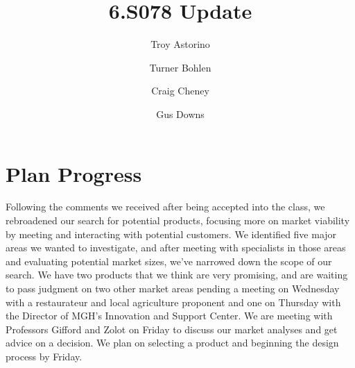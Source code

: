 \documentclass[10pt]{article}
\title{\vspace{-4em}6.S078 Update}
\author{Troy Astorino \and Turner Bohlen \and Craig Cheney \and Gus Downs}
\begin{document}
\maketitle

\section{Plan Progress}
Following the comments we received after being accepted into the class, we
rebroadened our search for potential products, focusing more on market viability
by meeting and interacting with potential customers. We identified five major
areas we wanted to investigate, and after meeting with specialists in those
areas and evaluating potential market sizes, we've narrowed down the scope of
our search. We have two products that we think are very promising, and are
waiting to pass judgment on two other market areas pending a meeting on
Wednesday with a restaurateur and local agriculture proponent and one on
Thursday with the Director of MGH's Innovation and Support Center. We are
meeting with Professors Gifford and Zolot on Friday to discuss our market
analyses and get advice on a decision. We plan on selecting a product and
beginning the design process by Friday.
\end{document}
